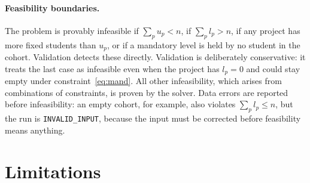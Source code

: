 \documentclass[11pt,a4paper]{article}
\newcommand{\code}[1]{\texttt{#1}}
\begin{document}
\paragraph{Feasibility boundaries.}
The problem is provably infeasible if $\sum_p u_p < n$, if
$\sum_p l_p > n$, if any project has more fixed students than $u_p$, or if a
mandatory level is held by no student in the cohort. Validation detects these
directly. Validation is deliberately conservative: it treats the last case as
infeasible even when the project has $l_p = 0$ and could stay empty under
constraint~\eqref{eq:mand}. All other infeasibility, which arises from
combinations of constraints, is proven by the solver. Data errors are
reported before infeasibility: an empty cohort, for example, also violates
$\sum_p l_p \le n$, but the run is \code{INVALID\_INPUT}, because the input
must be corrected before feasibility means anything.

\section{Limitations}
\end{document}
